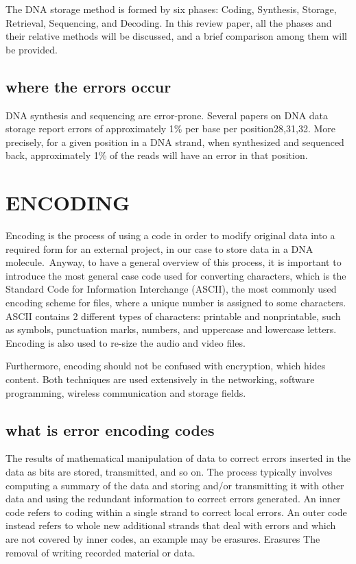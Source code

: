 \documentclass[10pt,twocolumn,twoside]{gsajnl}
\begin{document}
The DNA storage method is formed by six phases: Coding, Synthesis, Storage, Retrieval, Sequencing, and Decoding. In this review paper, all the phases and their relative methods will be discussed, and a brief comparison among them will be provided.

\begin{center}
\end{center}
\subsection{where the errors occur}
DNA synthesis and sequencing are error-prone. Several papers on DNA data storage report errors of approximately 1\% per base per position28,31,32. More precisely, for a given position in a DNA strand, when synthesized and sequenced back, approximately 1\% of the reads will have an error in that position. 

\section{ENCODING}

Encoding is the process of using a code in order to modify original data into a required form for an external project, in our case to store data in a DNA molecule.\
Anyway, to have a general overview of this process, it is important to introduce the most general case code used for converting characters, which is the Standard Code for Information Interchange (ASCII), the most commonly used encoding scheme for files, where a unique number is assigned to some characters. ASCII contains 2 different types of characters: printable and nonprintable, such as symbols, punctuation marks, numbers, and uppercase and lowercase letters. Encoding is also used to re-size the audio and video files. \

Furthermore, encoding should not be confused with encryption, which hides content. Both techniques are used extensively in the networking, software programming, wireless communication and storage fields.


\subsection{what is error encoding codes}
The results of mathematical manipulation of data to correct errors inserted in the data as bits are stored, transmitted, and so on. The process typically involves computing a summary of the data and storing and/or transmitting it with other data and using the redundant information to correct errors generated. An inner code refers to coding within a single strand to correct local errors. An outer code instead refers to whole new additional strands that deal with errors and which are not covered by inner codes, an example may be erasures.
Erasures
The removal of writing recorded material or data.\
\end{document}

